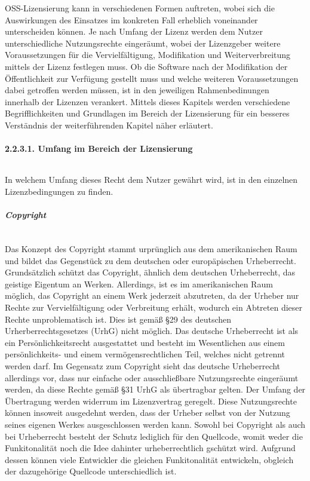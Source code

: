 OSS-Lizensierung kann in verschiedenen Formen auftreten, wobei sich die Auswirkungen des Einsatzes im konkreten Fall erheblich voneinander unterscheiden können. Je nach Umfang der Lizenz werden dem Nutzer unterschiedliche Nutzungsrechte eingeräumt, wobei der Lizenzgeber weitere Voraussetzungen für die Vervielfältigung, Modifikation und Weiterverbreitung mittels der Lizenz festlegen muss. Ob die Software nach der Modifikation der Öffentlichkeit zur Verfügung gestellt muss und welche weiteren Voraussetzungen dabei getroffen werden müssen, ist in den jeweiligen Rahmenbedinungen innerhalb der Lizenzen verankert. Mittels dieses Kapitels werden verschiedene Begrifflichkeiten und Grundlagen im Bereich der Lizensierung für ein besseres Verständnis der weiterführenden Kapitel näher erläutert. 

\paragraph{2.2.3.1. Umfang im Bereich der Lizensierung}$~$

In welchem Umfang dieses Recht dem Nutzer gewährt wird, ist in den einzelnen Lizenzbedingungen zu finden. 

\subparagraph{Copyright}$~$

Das Konzept des Copyright stammt urprünglich aus dem amerikanischen Raum und bildet das Gegenstück zu dem deutschen oder europäpischen Urheberrecht. \cite[S. 18]{schaaf_open-source-lizenzen_2013} Grundsätzlich schützt das Copyright, ähnlich dem deutschen Urheberrecht, das geistige Eigentum an Werken. Allerdings, ist es im amerikanischen Raum möglich, das Copyright an einem Werk jederzeit abzutreten, da der Urheber nur Rechte zur Vervielfältigung oder Verbreitung erhält, wodurch ein Abtreten dieser Rechte unproblematisch ist. \cite[S. 45]{bitkom_ev_open_2016} Dies ist gemäß §29 des deutschen Urherberrechtsgesetzes (UrhG) nicht möglich. Das deutsche Urheberrecht ist als ein Persönlichkeitsrecht ausgestattet und besteht im Wesentlichen aus einem persönlichkeits- und einem vermögensrechtlichen Teil, welches nicht getrennt werden darf. \cite[S. 45]{bitkom_ev_open_2016} Im Gegensatz zum Copyright sieht das deutsche Urheberrecht allerdings vor, dass nur einfache oder ausschließbare Nutzungsrechte eingeräumt werden, da diese Rechte gemäß §31 UrhG als übertragbar gelten. Der Umfang der Übertragung werden widerrum im Lizenzvertrag geregelt. Diese Nutzungsrechte können insoweit ausgedehnt werden, dass der Urheber selbst von der Nutzung seines eigenen Werkes ausgeschlossen werden kann. \cite[S. 45]{bitkom_ev_open_2016} Sowohl bei Copyright als auch bei Urheberrecht besteht der Schutz lediglich für den Quellcode, womit weder die Funkitonalität noch die Idee dahinter urheberrechtlich gschützt wird. \cite[S. 18]{schaaf_open-source-lizenzen_2013} Aufgrund dessen können viele Entwickler die gleichen Funkitonalität entwickeln, obgleich der dazugehörige Quellcode unterschiedlich ist.  

